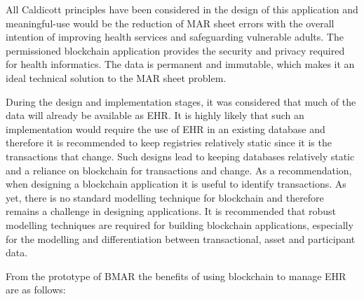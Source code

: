 \documentclass[runningheads]{llncs}
\begin{document}
All Caldicott principles have been considered in the design of this application and meaningful-use would be the reduction of MAR sheet errors with the overall intention of improving health services and safeguarding vulnerable adults. The permissioned blockchain application provides the security and privacy required for health informatics. The data is permanent and immutable, which makes it an ideal technical solution to the MAR sheet problem.
 

During the design and implementation stages, it was considered that much of the data will already be available as EHR. It is highly likely that such an implementation would require the use of EHR in an existing database and therefore it is recommended to keep registries relatively static since it is the transactions that change. Such designs lead to keeping databases relatively static and a reliance on blockchain for transactions and change. As a recommendation, when designing a blockchain application it is useful to identify transactions. As yet, there is no standard modelling technique for blockchain and therefore remains a  challenge in designing applications. It is recommended that robust modelling techniques are required for building blockchain applications, especially for the modelling and differentiation between transactional, asset and participant data.  

From the prototype of BMAR the benefits of using blockchain to manage EHR are as follows: 
\end{document}

